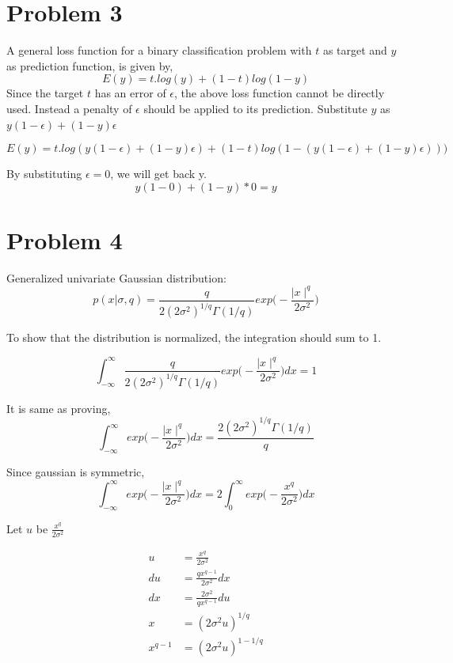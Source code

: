\documentclass{article}
\begin{document}
\section{Problem 3}

A general loss function for a binary classification problem with $t$ as target and $y$ as prediction function, is given by,
$$
E(y) = t . log (y) + (1 - t) log (1 - y)
$$
Since the target $t$ has an error of $\epsilon$, the above loss function cannot be directly used. Instead a penalty of $\epsilon$ should be applied to its prediction.
Substitute $y$ as $y (1 - \epsilon) + (1 - y) \epsilon$

$$
E(y) = t . log (y (1 - \epsilon) + (1 - y) \epsilon) + (1 - t) log (1 - (y (1 - \epsilon) + (1 - y) \epsilon)))
$$

By substituting $\epsilon = 0$, we will get back y.
$$
y (1 - 0) + (1 - y) * 0 = y
$$

\section{Problem 4}

Generalized univariate Gaussian distribution:
$$
p(x|\sigma, q) = \frac{q}{2(2\sigma^2)^{1/q}\Gamma(1/q)} exp \bigg( - \frac{\mid x \mid^q}{2\sigma^2} \bigg)
$$

To show that the distribution is normalized, the integration should sum to 1.

$$
\int_{-\infty}^{\infty} \frac{q}{2(2\sigma^2)^{1/q}\Gamma(1/q)} exp \bigg( - \frac{\mid x \mid^q}{2\sigma^2} \bigg) dx = 1
$$

It is same as proving,
$$
\int_{-\infty}^{\infty} exp \bigg( - \frac{\mid x \mid^q}{2\sigma^2} \bigg) dx = \frac{2(2\sigma^2)^{1/q}\Gamma(1/q)}{q}
$$

Since gaussian is symmetric,
$$
\int_{-\infty}^{\infty} exp \bigg( - \frac{\mid x \mid^q}{2\sigma^2} \bigg) dx = 2 \int_{0}^{\infty} exp \bigg( - \frac{x^q}{2\sigma^2} \bigg) dx
$$

Let $u$ be $\frac{x^q}{2\sigma^2}$

\begin{align*}
u &= \frac{x^q}{2\sigma^2} \\
du &= \frac{qx^{q-1}}{2\sigma^2} dx \\
dx &= \frac{2\sigma^2}{qx^{q-1}} du \\
x &= (2\sigma^2u)^{1/q}  \\
x^{q-1} &= (2\sigma^2u)^{1-1/q}
\end{align*}
\end{document}
